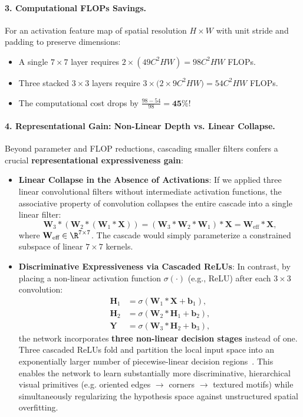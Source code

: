 \paragraph{3. Computational FLOPs Savings.}
For an activation feature map of spatial resolution $H \times W$ with unit stride and padding to preserve dimensions:
\begin{itemize}[leftmargin=*]
  \item A single $7 \times 7$ layer requires $2 \times (49 C^2 H W) = 98 C^2 H W$ FLOPs.
  \item Three stacked $3 \times 3$ layers require $3 \times \big( 2 \times 9 C^2 H W \big) = 54 C^2 H W$ FLOPs.
  \item The computational cost drops by $\frac{98 - 54}{98} = \mathbf{45\%}$!
\end{itemize}

\paragraph{4. Representational Gain: Non-Linear Depth vs. Linear Collapse.}
Beyond parameter and FLOP reductions, cascading smaller filters confers a crucial \textbf{representational expressiveness gain}:
\begin{itemize}[leftmargin=*]
  \item \textbf{Linear Collapse in the Absence of Activations}: If we applied three linear convolutional filters without intermediate activation functions, the associative property of convolution collapses the entire cascade into a single linear filter:
    \begin{equation}
    \mathbf{W}_3 * (\mathbf{W}_2 * (\mathbf{W}_1 * \mathbf{X})) = (\mathbf{W}_3 * \mathbf{W}_2 * \mathbf{W}_1) * \mathbf{X} = \mathbf{W}_{\text{eff}} * \mathbf{X},
    \end{equation}
    where $\mathbf{W}_{\text{eff}} \in \R^{7 \times 7}$. The cascade would simply parameterize a constrained subspace of linear $7 \times 7$ kernels.
  \item \textbf{Discriminative Expressiveness via Cascaded ReLUs}: In contrast, by placing a non-linear activation function $\sigma(\cdot)$ (e.g., ReLU) after each $3 \times 3$ convolution:
    \begin{align}
    \mathbf{H}_1 &= \sigma\left(\mathbf{W}_1 * \mathbf{X} + \mathbf{b}_1\right), \\
    \mathbf{H}_2 &= \sigma\left(\mathbf{W}_2 * \mathbf{H}_1 + \mathbf{b}_2\right), \\
    \mathbf{Y} &= \sigma\left(\mathbf{W}_3 * \mathbf{H}_2 + \mathbf{b}_3\right),
    \end{align}
    the network incorporates \textbf{three non-linear decision stages} instead of one. Three cascaded ReLUs fold and partition the local input space into an exponentially larger number of piecewise-linear decision regions~\cite{montufar2014number,telgarsky2016benefits}. This enables the network to learn substantially more discriminative, hierarchical visual primitives (e.g. oriented edges $\to$ corners $\to$ textured motifs) while simultaneously regularizing the hypothesis space against unstructured spatial overfitting.
\end{itemize}

